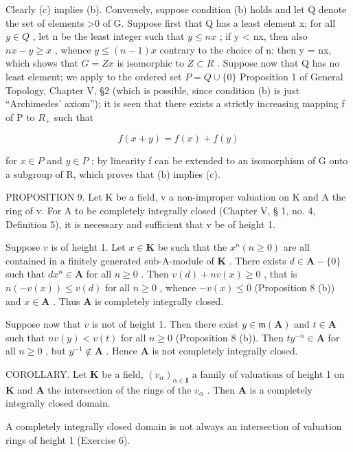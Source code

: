 Clearly (c) implies (b). Conversely, suppose condition (b) holds and let Q denote the set of elements >0 of G. Suppose first that Q has a least element x; for all \(y \in Q\) , let n be the least integer such that \(y \leqslant nx\) ; if y < nx, then also \(nx - y \geqslant x\) , whence \(y \leqslant (n - 1)x\) contrary to the choice of n; then y = nx, which shows that \(G = Zx\) is isomorphic to \(Z \subset R\) . Suppose now that Q has no least element; we apply to the ordered set \(P = Q \cup \{0\}\) Proposition 1 of General Topology, Chapter V, §2 (which is possible, since condition (b) is just ``Archimedes' axiom''); it is seen that there exists a strictly increasing mapping f of P to \(R_{+}\) such that

\[
f (x + y) = f (x) + f (y)
\]

for \(x \in P\) and \(y \in P\) ; by linearity f can be extended to an isomorphism of G onto a subgroup of R, which proves that (b) implies (c).

PROPOSITION 9. Let K be a field, v a non-improper valuation on K and A the ring of v. For A to be completely integrally closed (Chapter V, § 1, no. 4, Definition 5), it is necessary and sufficient that v be of height 1.

Suppose \(v\) is of height 1. Let \(x \in \mathbf{K}\) be such that the \(x^n (n \geqslant 0)\) are all contained in a finitely generated sub-A-module of \(\mathbf{K}\) . There exists \(d \in \mathbf{A} - \{0\}\) such that \(dx^n \in \mathbf{A}\) for all \(n \geqslant 0\) . Then \(v(d) + nv(x) \geqslant 0\) , that is \(n(-v(x)) \leqslant v(d)\) for all \(n \geqslant 0\) , whence \(-v(x) \leqslant 0\) (Proposition 8 (b)) and \(x \in \mathbf{A}\) . Thus \(\mathbf{A}\) is completely integrally closed.

Suppose now that \(v\) is not of height 1. Then there exist \(y \in \mathfrak{m}(\mathbf{A})\) and \(t \in \mathbf{A}\) such that \(nv(y) < v(t)\) for all \(n \geqslant 0\) (Proposition 8 (b)). Then \(ty^{-n} \in \mathbf{A}\) for all \(n \geqslant 0\) , but \(y^{-1} \notin \mathbf{A}\) . Hence \(\mathbf{A}\) is not completely integrally closed.

COROLLARY. Let \(\mathbf{K}\) be a field, \((v_{\alpha})_{\alpha \in \mathbf{I}}\) a family of valuations of height 1 on \(\mathbf{K}\) and \(\mathbf{A}\) the intersection of the rings of the \(v_{\alpha}\) . Then \(\mathbf{A}\) is a completely integrally closed domain.

A completely integrally closed domain is not always an intersection of valuation rings of height 1 (Exercise 6).

